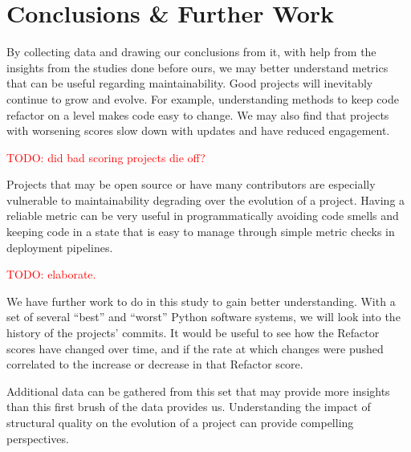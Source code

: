 \documentclass[12pt,conference]{IEEEtran}
\newcommand\todo[1]{\textcolor{red}{#1}}
\begin{document}

\vspace{0.5cm}
\section{Conclusions \& Further Work}
\vspace{0.25cm}

By collecting data and drawing our conclusions from it, with help from the insights from the studies done before ours, we may better understand metrics that can be useful regarding maintainability. Good projects will inevitably continue to grow and evolve. For example, understanding methods to keep code refactor on a level makes code easy to change. We may also find that projects with worsening scores slow down with updates and have reduced engagement.

\todo{TODO: did bad scoring projects die off?}

Projects that may be open source or have many contributors are especially vulnerable to maintainability degrading over the evolution of a project. Having a reliable metric can be very useful in programmatically avoiding code smells and keeping code in a state that is easy to manage through simple metric checks in deployment pipelines.

\todo{TODO: elaborate.}

We have further work to do in this study to gain better understanding. With a set of several ``best'' and ``worst'' Python software systems, we will look into the history of the projects' commits. It would be useful to see how the Refactor scores have changed over time, and if the rate at which changes were pushed correlated to the increase or decrease in that Refactor score. 

Additional data can be gathered from this set that may provide more insights than this first brush of the data provides us. Understanding the impact of structural quality on the evolution of a project can provide compelling perspectives.

\newpage



\end{document}
